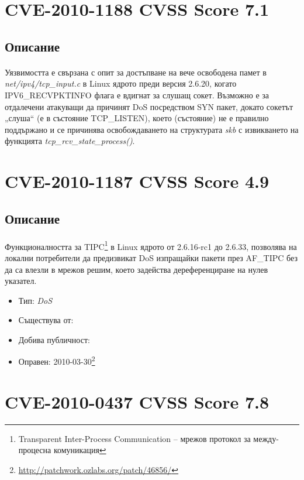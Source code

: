 \documentclass[a4paper,12pt,leqno]{article}
\begin{document}
\section{CVE-2010-1188 CVSS Score 7.1}
\subsection{Описание}
\paragraph{}
Уязвимостта е свързана с опит за достъпване на вече освободена памет в 
\textit{net/ipv4/tcp\_input.c} в Linux ядрото преди версия 2.6.20, когато 
IPV6\_RECVPKTINFO флага е вдигнат за слушащ сокет. Възможно е за 
отдалечени атакуващи да причинят DoS посредством SYN пакет, докато 
сокетът „слуша“ (е в състояние TCP\_LISTEN), което (състояние) не е правилно 
поддържано и се причинява освобождаването на структурата \textit{skb} с 
извикването на функцията \textit{tcp\_rcv\_state\_process()}.

\section{CVE-2010-1187 CVSS Score 4.9}
\subsection{Описание}
\paragraph{}
Функционалността за TIPC\footnote{Transparent Inter-Process Communication – мрежов протокол за между-процесна комуникация} в Linux ядрото от 2.6.16-rc1 до 2.6.33, позволява 
на локални потребители да предизвикат DoS изпращайки пакети през AF\_TIPC 
без да са влезли в мрежов решим, което задейства дереференциране на нулев 
указател.

\begin{itemize}
    \item Тип: \textit{DoS}
    \item Съществува от:
  	\item Добива публичност: 
    \item Оправен: 2010-03-30\footnote{\url{http://patchwork.ozlabs.org/patch/46856/}}
\end{itemize}


\section{CVE-2010-0437 CVSS Score 7.8}
\end{document}
